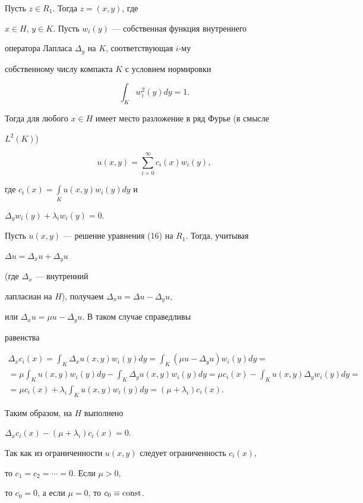 \begin{pf} Пусть $z \in R_1$. Тогда $z=(x,y)$, где


$x \in H$, $y \in K$. Пусть $w_i(y)$ --- собственная функция внутреннего


оператора Лапласа $\Delta_y$ на $K$, соответствующая $i$-му


собственному числу компакта $K$ с условием нормировки


$$


\int_{K}w_i^2(y)dy = 1.


$$


Тогда для любого $x \in H$ имеет место разложение в ряд Фурье (в смысле


$L^2(K)$)


$$


u(x,y) = \sum_{i=0}^{\infty}c_i(x)w_i(y),


$$


где $c_i(x) = \int\limits_{K}u(x,y)w_i(y)dy$ и


$\Delta_yw_i(y) + \lambda_iw_i(y) = 0.$





Пусть $u(x,y)$ --- решение уравнения (16) на $R_1$. Тогда, учитывая


$\Delta u = \Delta_x u + \Delta_y u$


(где $\Delta_x$ --- внутренний


лапласиан на $H$), получаем $\Delta_x u = \Delta u - \Delta_y u$,


или $\Delta_x u = \mu u - \Delta_y u$. В таком случае справедливы


равенства


\begin{gather*}


\Delta_xc_i(x) = \int_{K}\Delta_xu(x,y) w_i(y) dy =


\int_{K} (\mu u - \Delta_yu)w_i(y) dy = \\


%


= \mu \int_{K} u(x,y)w_i(y)dy - \int_{K}\Delta_y


u(x,y) w_i(y) dy = \mu c_i(x) - \int_{K} u(x,y) \Delta_y w_i(y) dy = \\


%


= \mu c_i(x) + \lambda_i \int_{K} u(x,y) w_i(y) dy =


(\mu + \lambda_i) c_i(x).


\end{gather*}





Таким образом, на $H$ выполнено


$\Delta_x c_i(x) - (\mu + \lambda_i) c_i(x) = 0$.


Так как из ограниченности $u(x,y)$ следует ограниченность $c_i(x)$,


то $c_1 = c_2 = \dotsb = 0$. Если $\mu > 0$,


то $c_0 = 0$, а если $\mu = 0 $, то $c_0 \equiv \operatorname{const}$.


\end{pf}





